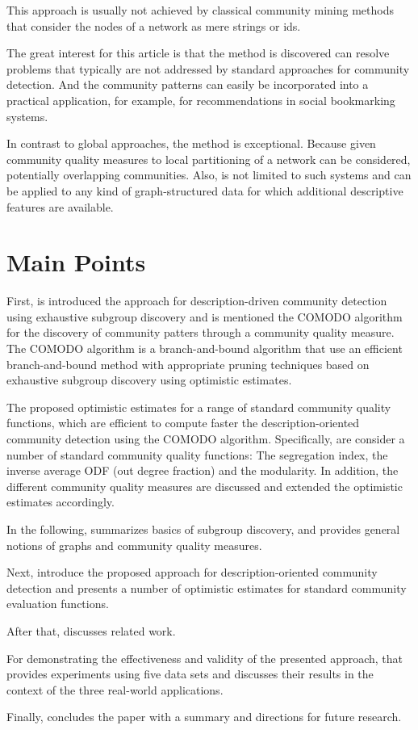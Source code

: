 \documentclass[a4paper]{article}
\begin{document}
This approach is usually not achieved by classical community mining methods that consider the nodes of a network as mere strings or ids.
\vskip 0.3cm

The great interest for this article is that the method is discovered can resolve problems that typically are not addressed by standard approaches for community detection. And the community patterns can easily be incorporated into a practical application, for example, for recommendations in social bookmarking systems.
\vskip 0.3cm

In contrast to global approaches, the method is exceptional. Because given community quality measures to local partitioning of a network can be considered, potentially overlapping communities. Also, is not limited to such systems and can be applied to any kind of graph-structured data for which additional descriptive features are available.

\section{Main Points}

First, is introduced the approach for description-driven community detection using exhaustive subgroup discovery and is mentioned the COMODO algorithm for the discovery of community patters through a community quality measure. The COMODO algorithm is a branch-and-bound algorithm that use an efficient branch-and-bound method with appropriate pruning techniques based on exhaustive subgroup discovery using optimistic estimates. 
\vskip 0.3cm
	
The proposed optimistic estimates for a range of standard community quality functions, which are efficient to compute faster the description-oriented community detection using the COMODO algorithm. Specifically, are consider a number of standard community quality functions: The segregation index, the inverse average ODF (out degree fraction) and the modularity. In addition, the different community quality measures are discussed and extended the optimistic estimates accordingly. 
\vskip 0.3cm

In the following, summarizes basics of subgroup discovery, and provides general notions of graphs and community quality measures. 
\vskip 0.3cm

Next, introduce the proposed approach for description-oriented community detection and presents a number of optimistic estimates for standard community evaluation functions. 
\vskip 0.3cm

After that, discusses related work. 
\vskip 0.3cm

For demonstrating the effectiveness and validity of the presented approach,  that provides experiments using five data sets and discusses their results in the context of the three real-world applications. 
\vskip 0.3cm

Finally, concludes the paper with a summary and directions for future research.
\end{document}
